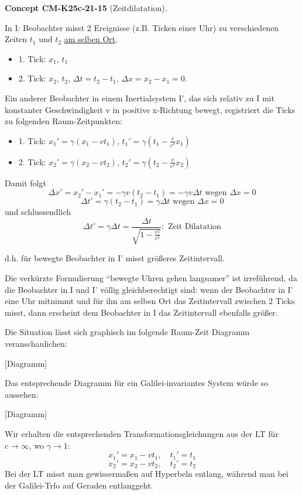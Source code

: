 \documentclass[10pt, letterpaper]{article}
\newcommand{\CustomHeading}[3]{%
  \par\medskip\noindent%
  \textbf{#1 #2} \textnormal{(#3)}.\enskip%
}
\newenvironment{CONC}[2]{\CustomHeading{Concept}{#1}{#2}}{}
\begin{document}
\begin{CONC}{CM-K25c-21-15}{Zeitdilatation}
In I: Beobachter misst 2 Ereignisse (z.B. Ticken einer Uhr) zu verschiedenen Zeiten $t_1$ und $t_2$ \underline{am selben Ort}.

\begin{itemize}
  \item 1. Tick: $x_1$, $t_1$

  \item 2. Tick: $x_2$, $t_2$, $\Delta t = t_2-t_1$, $\Delta x = x_2-x_1=0$.
\end{itemize}

Ein anderer Beobachter in einem Inertialsystem I', das sich relativ zu I mit konstanter Geschwindigkeit v in positive x-Richtung bewegt, registriert die Ticks zu folgenden Raum-Zeitpunkten:

\begin{itemize}
  \item 1. Tick: $x_1' = \gamma(x_1-vt_1)$, $t_1' = \gamma(t_1-\frac{v}{c^2}x_1)$

  \item 2. Tick: $x_2' = \gamma(x_2-vt_2)$, $t_2' = \gamma(t_2-\frac{v}{c^2}x_2)$
\end{itemize}
Damit folgt
\[ \Delta x' = x_2'-x_1' = -\gamma v(t_2-t_1) = -\gamma v \Delta t \text{ wegen } \Delta x=0\]
\[\Delta t' = \gamma(t_2-t_1) = \gamma\Delta t \text{ wegen } \Delta x=0\]
und schlussendlich
\[\Delta t' = \gamma\Delta t = \frac{\Delta t}{\sqrt{1-\frac{v^2}{c^2}}} : \text{ Zeit Dilatation}\]

d.h. für bewegte Beobachter in I' misst größeres Zeitintervall.

Die verkürzte Formulierung ``bewegte Uhren gehen langsamer'' ist irreführend, da die Beobachter in I und I' völlig gleichberechtigt sind: wenn der Beobachter in I' eine Uhr mitnimmt und für ihn am selben Ort das Zeitintervall zwischen 2 Ticks misst, dann erscheint dem Beobachter in I das Zeitintervall ebenfalls größer.

Die Situation lässt sich graphisch im folgende Raum-Zeit Diagramm veranschaulichen:

[Diagramm]

Das entsprechende Diagramm für ein Galilei-invariantes System würde so aussehen:

[Diagramm]

Wir erhalten die entsprechenden Transformationsgleichungen aus der LT für $c \to \infty$, wo $\gamma \to 1$:
\[
x_1' = x_1 - vt_1, \quad t_1' = t_1
\]
\[
x_2' = x_2 - vt_2, \quad t_2' = t_2
\]
Bei der LT misst man gewissermaßen auf Hyperbeln entlang, während man bei der Galilei-Trfo auf Geraden entlanggeht.
\end{CONC}
\end{document}
